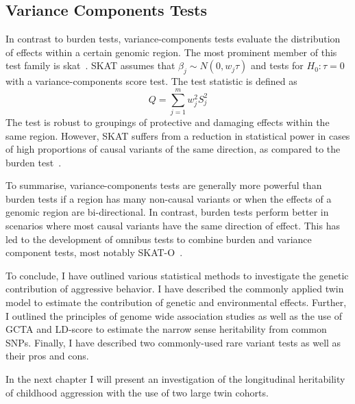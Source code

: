\subsection{Variance Components Tests}
\label{sub:variance_component_tests}
In contrast to burden tests, variance-components tests evaluate the distribution of effects within a certain genomic region.
The most prominent member of this test family is \acrfull{skat}~\cite{Wu2011}.
SKAT assumes that $\beta_j\sim N(0,w_j\tau)$ and tests for $H_0: \tau = 0$ with a variance-components score test.
The test statistic is defined as
\begin{equation}\label{eq:skat}
  Q = \sum^{m}_{j=1} w_{j}^2 S_{j}^2
\end{equation}
The test is robust to groupings of protective and damaging effects within the same region.
However,  SKAT suffers from a reduction in statistical power in cases of high proportions of causal variants of the same direction, as compared to the burden test~\cite{Derkach2013a}.

To summarise, variance-components tests are generally more powerful than burden tests if a region has many non-causal variants or when the effects of a genomic region are bi-directional.
In contrast, burden tests perform better in scenarios where most causal variants have the same direction of effect.
This has led to the development of omnibus tests to combine burden and variance component tests, most notably SKAT-O~\cite{Lee2012}.
\bigskip

To conclude, I have outlined various statistical methods to investigate the genetic contribution of aggressive behavior.
I have described the commonly applied twin model to estimate the contribution of genetic and environmental effects.
Further, I outlined the principles of genome wide association studies as well as the use of GCTA and LD-score to estimate the narrow sense heritability from common SNPs.
Finally, I have described two commonly-used rare variant tests as well as their pros and cons.

In the next chapter I will present an investigation of the longitudinal heritability of childhood aggression with the use of two large twin cohorts. 
